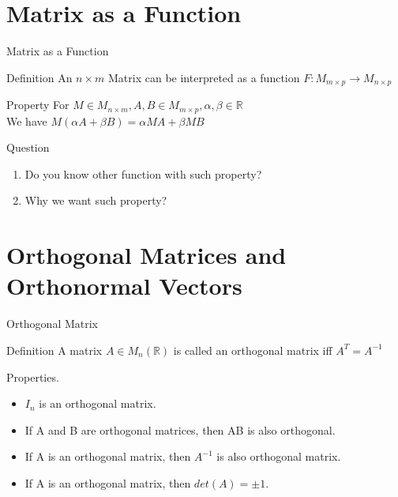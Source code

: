 \documentclass[aspectratio=169]{beamer}
\begin{document}
\section{Matrix as a Function}
\begin{frame}{Matrix as a Function}
    \begin{block}{Definition}
        An $ n \times m$ Matrix can be interpreted as a function $F: M_{m \times p} \to M_{n \times p}$ 
    \end{block}
    \begin{block}{Property}
        For $M \in M_{n \times m}, A,B \in M_{m \times p}, \alpha , \beta \in \mathbb{R}$ \\
        We have $M(\alpha A + \beta B) = \alpha MA + \beta MB$
    \end{block}
    \begin{block}{Question}
        \begin{enumerate}
            \item Do you know other function with such property?
            \item Why we want such property?
        \end{enumerate}
    \end{block}
\end{frame}
\section{Orthogonal Matrices and Orthonormal Vectors}
    \begin{frame}{Orthogonal Matrix}
        \begin{block}{Definition}
            A matrix $A \in M_n(\mathbb{R})$ is called an orthogonal matrix iff $A^T = A^{-1}$
        \end{block}
        \begin{block}{Properties.} 
        \begin{itemize}
            \item $I_n$ is an orthogonal matrix.
            \item If A and B are orthogonal matrices, then AB is also orthogonal.
            \item If A is an orthogonal matrix, then $A^{-1}$ is also orthogonal matrix.
            \item If A is an orthogonal matrix, then $det(A)= \pm 1$. 
        \end{itemize}
        \end{block}
    \end{frame}
    
\end{document}

